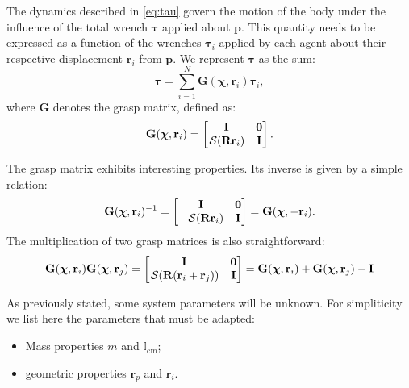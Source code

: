 The dynamics described in \eqref{eq:tau} govern the motion of the body under the influence of the total wrench $\boldsymbol{\tau}$ applied about $\mathbf{p}$. This quantity needs to be expressed as a function of the wrenches $\boldsymbol{\tau}_i$ applied by each agent about their respective displacement $\mathbf{r}_i$ from $\mathbf{p}$. We represent $\boldsymbol{\tau}$ as the sum:
\begin{equation}
    \boldsymbol{\tau} = \sum_{i=1}^N\mathbf{G}(\boldsymbol{\chi}, \mathbf{r}_i)\boldsymbol{\tau}_i, \label{eq:tauNtauIrelation}
\end{equation}
where $\mathbf{G}$ denotes the grasp matrix, defined as:
\begin{equation}
    \mathbf{G}(\boldsymbol{\chi}, \mathbf{r}_i) = \begin{bmatrix}
        \mathbf{I} & \mathbf{0} \\
        \SL[\mathbf{R}\mathbf{r}_i] & \mathbf{I}
    \end{bmatrix}. \label{eq:graspmatrix}
\end{equation}

The grasp matrix exhibits interesting properties. Its inverse is given by a simple relation:
\begin{align}
    \mathbf{G}(\boldsymbol{\chi}, \mathbf{r}_i)^{-1} = \begin{bmatrix}
        \mathbf{I} & \mathbf{0} \\
        -\SL[\mathbf{R}\mathbf{r}_i] & \mathbf{I}
    \end{bmatrix} = \mathbf{G}(\boldsymbol{\chi}, -\mathbf{r}_i).
\end{align}
The multiplication of two grasp matrices is also straightforward:
\begin{align}
    \mathbf{G}(\boldsymbol{\chi}, \mathbf{r}_i)\mathbf{G}(\boldsymbol{\chi}, \mathbf{r}_j) =
    \begin{bmatrix}
        \mathbf{I} & \mathbf{0} \\
        \SL[\mathbf{R}(\mathbf{r}_i + \mathbf{r}_j)] & \mathbf{I}
    \end{bmatrix} = \mathbf{G}(\boldsymbol{\chi}, \mathbf{r}_i) + \mathbf{G}(\boldsymbol{\chi}, \mathbf{r}_j) - \mathbf{I}
\end{align}

As previously stated, some system parameters will be unknown. For simpliticity we list here the parameters that must be adapted:
\begin{itemize}
    \item Mass properties $m$ and $\mathbb{I}_\text{cm}$;
    \item geometric properties $\mathbf{r}_p$ and $\mathbf{r}_i$.
\end{itemize}

